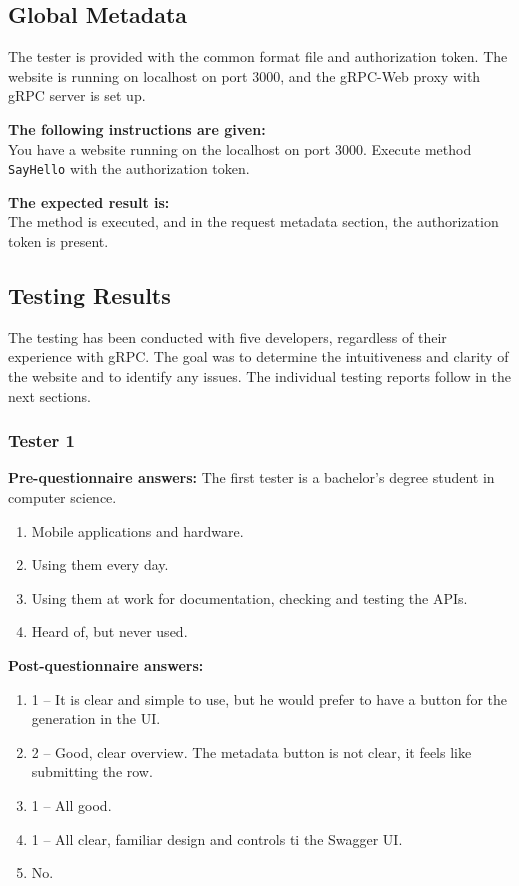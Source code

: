 \subsection{Global Metadata}
The tester is provided with the common format file and authorization token.
The website is running on localhost on port 3000, and the gRPC-Web proxy with gRPC server is set up.

\textbf{The following instructions are given:}\\
You have a website running on the localhost on port 3000.
Execute method \texttt{SayHello} with the authorization token.

\textbf{The expected result is:}\\
The method is executed, and in the request metadata section, the authorization token is present.

\subsection{Testing Results}
The testing has been conducted with five developers, regardless of their experience with gRPC\@.
The goal was to determine the intuitiveness and clarity of the website and to identify any issues.
The individual testing reports follow in the next sections.

\subsubsection{Tester 1}
\textbf{Pre-questionnaire answers:}
The first tester is a bachelor's degree student in computer science.

\begin{enumerate}
    \item Mobile applications and hardware.
    \item Using them every day.
    \item Using them at work for documentation, checking and testing the APIs.
    \item Heard of, but never used.
\end{enumerate}

\textbf{Post-questionnaire answers:}
\begin{enumerate}
    \item 1 -- It is clear and simple to use, but he would prefer to have a button for the generation in the UI\@.
    \item 2 -- Good, clear overview.
    The metadata button is not clear, it feels like submitting the row.
    \item 1 -- All good.
    \item 1 -- All clear, familiar design and controls ti the Swagger UI\@.
    \item No.
\end{enumerate}

